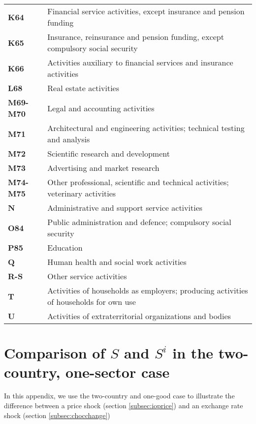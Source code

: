 \documentclass[11pt,a4paper]{article}
\begin{document}
\begin{appendices}
\begin{table}[!h]
\begin{tabular}{ll}
\textbf{K64} &{Financial service activities, except insurance and pension funding}\\
\textbf{K65} &{Insurance, reinsurance and pension funding, except compulsory social security}\\
\textbf{K66} &{Activities auxiliary to financial services and insurance activities}\\
\textbf{L68} &{Real estate activities}\\
\textbf{M69-M70} &{Legal and accounting activities}\\
\textbf{M71} &{Architectural and engineering activities; technical testing and analysis}\\
\textbf{M72} &{Scientific research and development}\\
\textbf{M73} &{Advertising and market research}\\
\textbf{M74-M75} &{Other professional, scientific and technical activities; veterinary activities}\\
\textbf{N} &{Administrative and support service activities}\\
\textbf{O84} &{Public administration and defence; compulsory social security}\\
\textbf{P85} &{Education}\\
\textbf{Q} &{Human health and social work activities}\\
\textbf{R-S} &{Other service activities}\\
\textbf{T} &{Activities of households as employers; producing activities of households for own use}\\
\textbf{U} &{Activities of extraterritorial organizations and bodies}\\
  	\end{tabular}
\label{tab:wiodindustries}
\end{table}

\newpage
\section{Comparison of $S$ and $S^i$ in the two-country, one-sector case}
In this appendix, we use the two-country and one-good case to illustrate the difference between a price shock (section \ref{subsec:ioprice}) and an exchange rate shock (section \ref{subsec:chocchange})

\end{appendices}
\end{document}
